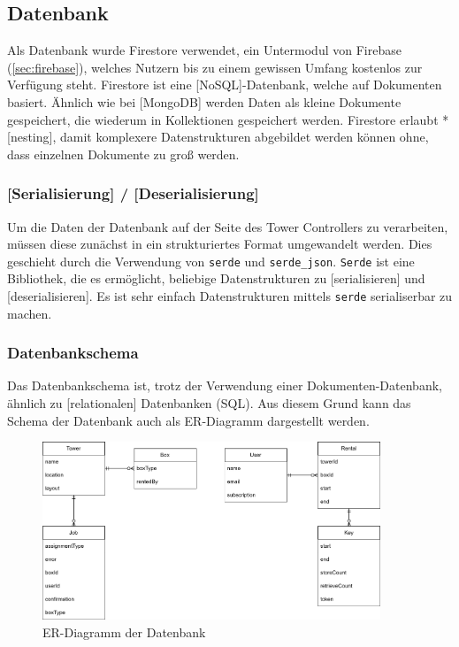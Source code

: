 \subsection{Datenbank}

Als Datenbank wurde Firestore verwendet, ein Untermodul von Firebase (\ref{sec:firebase}), welches Nutzern bis zu einem gewissen Umfang kostenlos zur Verfügung steht. Firestore ist eine [NoSQL]-Datenbank, welche auf Dokumenten basiert. Ähnlich wie bei [MongoDB] werden Daten als kleine Dokumente gespeichert, die wiederum in Kollektionen gespeichert werden. Firestore erlaubt *[nesting], damit komplexere Datenstrukturen abgebildet werden können ohne, dass einzelnen Dokumente zu groß werden.


\subsubsection{[Serialisierung] / [Deserialisierung]}

Um die Daten der Datenbank auf der Seite des Tower Controllers zu verarbeiten, müssen diese zunächst in ein strukturiertes Format umgewandelt werden. Dies geschieht durch die Verwendung von \texttt{serde} und \texttt{serde\_json}. \texttt{Serde} ist eine Bibliothek, die es ermöglicht, beliebige Datenstrukturen zu [serialisieren] und [deserialisieren]. Es ist sehr einfach Datenstrukturen mittels \texttt{serde} serialiserbar zu machen.


\subsubsection{Datenbankschema}
Das Datenbankschema ist, trotz der Verwendung einer Dokumenten-Datenbank, ähnlich zu [relationalen] Datenbanken (SQL). Aus diesem Grund kann das Schema der Datenbank auch als \ac{ER}-Diagramm dargestellt werden.

\begin{figure}[H]
    \centering
    \includegraphics[width=0.9\textwidth]{images/datenbankstruktur.png}
    \caption{ER-Diagramm der Datenbank}
    \label{fig:er_diagramm}
\end{figure}

